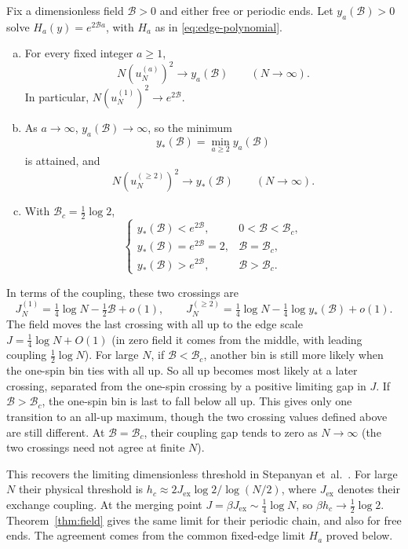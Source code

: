 \begin{theorem}\label{thm:field}
Fix a dimensionless field $\mathcal B>0$ and either free or periodic
ends. Let $y_a(\mathcal B)>0$ solve $H_a(y)=e^{2\mathcal Ba}$, with $H_a$
as in \eqref{eq:edge-polynomial}.
\begin{enumerate}[(a)]
\item For every fixed integer $a\ge1$,
\[
N(u^{(a)}_N)^2\longrightarrow y_a(\mathcal B)
\qquad(N\to\infty).
\]
In particular, $N(u^{(1)}_N)^2\to e^{2\mathcal B}$.
\item As $a\to\infty$, $y_a(\mathcal B)\to\infty$, so the minimum
\[
y_*(\mathcal B)=\min_{a\ge2}y_a(\mathcal B)
\]
is attained, and
\[
N(u^{(\ge2)}_N)^2\longrightarrow y_*(\mathcal B)
\qquad(N\to\infty).
\]
\item With $\mathcal B_c=\frac12\log2$,
\[
\begin{cases}
y_*(\mathcal B)<e^{2\mathcal B},&0<\mathcal B<\mathcal B_c,\\
y_*(\mathcal B)=e^{2\mathcal B}=2,&\mathcal B=\mathcal B_c,\\
y_*(\mathcal B)>e^{2\mathcal B},&\mathcal B>\mathcal B_c.
\end{cases}
\]
\end{enumerate}
\end{theorem}

In terms of the coupling, these two crossings are
\[
J_N^{(1)}=\tfrac14\log N-\tfrac12\mathcal B+o(1),\qquad
J_N^{(\ge2)}=\tfrac14\log N-\tfrac14\log y_*(\mathcal B)+o(1).
\]
The field moves the last crossing with all up to the edge scale
$J=\frac14\log N+O(1)$ (in zero field it comes from the middle, with
leading coupling $\frac12\log N$). For large $N$, if
$\mathcal B<\mathcal B_c$, another bin is still more likely when the
one-spin bin ties with all up. So all up becomes most likely at a later
crossing, separated from the one-spin crossing by a positive limiting
gap in $J$. If $\mathcal B>\mathcal B_c$, the one-spin bin is last to
fall below all up. This gives only one transition to an all-up maximum,
though the two crossing values defined above are still different.
At $\mathcal B=\mathcal B_c$, their coupling gap tends to zero as
$N\to\infty$ (the two crossings need not agree at finite $N$).

This recovers the limiting dimensionless threshold in Stepanyan
et~al.\@~\cite[Eq.~(20)]{stepanyan2024}. For large $N$ their physical threshold is
$h_c\approx2J_{\mathrm{ex}}\log2/\log(N/2)$, where $J_{\mathrm{ex}}$ denotes their
exchange coupling. At the merging point
$J=\beta J_{\mathrm{ex}}\sim\frac14\log N$, so $\beta h_c\to\frac12\log2$.
Theorem~\ref{thm:field} gives the same limit for their periodic chain, and
also for free ends. The agreement
comes from the common fixed-edge limit $H_a$ proved below.

